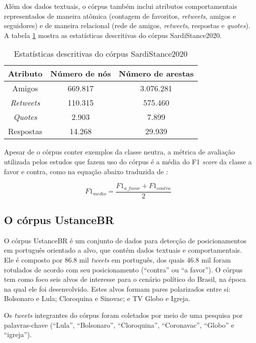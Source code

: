 \documentclass[
	12pt, oneside, a4paper, english, brazil
]{abntex2ppgsi}
\begin{document}
Além dos dados textuais, o córpus também inclui atributos comportamentais representados de maneira atômica (contagem de favoritos, {\em retweets}, amigos e seguidores) e de maneira relacional (rede de amigos, {\em retweets}, respostas e {\em quotes}). A tabela \ref{tab:estatisticas-sardistance} mostra as estatísticas descritivas do córpus SardiStance2020. 

\begin{table}[ht]
\centering
\caption{Estatísticas descritivas do córpus SardiStance2020}
\begin{tabular}{c c c}
\hline
Atributo & Número de nós & Número de arestas \\ \hline
Amigos & 669.817 & 3.076.281 \\
{\em Retweets} & 110.315 & 575.460 \\
{\em Quotes} & 2.903 & 7.899 \\
Respostas & 14.268 & 29.939 \\ \hline
\end{tabular}
\label{tab:estatisticas-sardistance}
\end{table}

Apesar de o córpus conter exemplos da classe neutra, a métrica de avaliação utilizada pelos estudos que fazem uso do córpus é a média do F1 {\em score} da classe a favor e contra, como na equação abaixo traduzida de :

\begin{equation}
F1_{medio} = \frac{F1_{a\_favor} + F1_{contra}}{2}
\end{equation}

\subsection{O córpus UstanceBR}
\label{sec:ustancebr}

O córpus UstanceBR \cite{ustancebr} é um conjunto de dados para detecção de posicionamentos em português orientado a alvo, que contém dados textuais e comportamentais. Ele é composto por 86.8 mil {\em tweets} em português, dos quais 46.8 mil foram rotulados de acordo com seu posicionamento (``contra'' ou ``a favor''). O córpus tem como foco seis alvos de interesse para o cenário político do Brasil, na época na qual ele foi desenvolvido. Estes alvos formam pares polarizados entre si: Bolsonaro e Lula; Cloroquina e Sinovac; e TV Globo e Igreja. 

Os {\em tweets} integrantes do córpus foram coletados por meio de uma pesquisa por palavras-chave (``Lula'', ``Bolsonaro'', ``Cloroquina'', ``Coronavac'', ``Globo'' e ``igreja''). 
\end{document}
